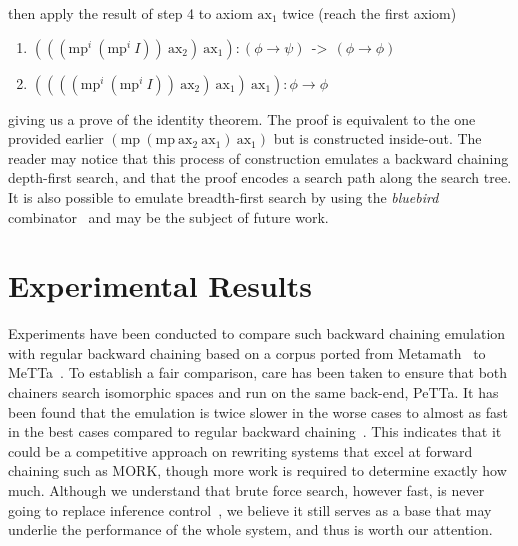 \documentclass{easychair}
\newcommand{\arrowtype}{\ \ \text{->}\ \ }
\newcommand{\axon}{\text{ax}_1}
\newcommand{\axtw}{\text{ax}_2}
\newcommand{\axmp}{\text{mp}}
\newcommand{\axmpi}{\text{mp}^i}
\newcommand{\idiot}{I}
\newcommand{\av}{\phi}
\newcommand{\bv}{\psi}
\begin{document}
then apply the result of step 4 to axiom $\axon$ twice (reach the first axiom)
\begin{enumerate}
\item[5.]
  $(((\axmpi\ (\axmpi\ \idiot))\ \axtw)\ \axon) : (\av \to \bv) \arrowtype (\av \to \av)$
\item[6.] $((((\axmpi\ (\axmpi\ \idiot))\ \axtw)\ \axon)\ \axon) : \av \to \av$
\end{enumerate}
giving us a prove of the identity theorem.  The proof is equivalent to
the one provided earlier $(\axmp\ (\axmp\ \axtw\ \axon)\ \axon)$ but
is constructed inside-out.  The reader may notice that this process of
construction emulates a backward chaining depth-first search, and that
the proof encodes a search path along the search tree.  It is also
possible to emulate breadth-first search by using the \emph{bluebird}
combinator~\cite{Smullyan1992ToMock} and may be the subject of future
work.

\section{Experimental Results}

Experiments have been conducted to compare such backward chaining
emulation with regular backward chaining based on a corpus ported from
Metamath~\cite{Metamath} to MeTTa~\cite{MeTTa,
  MeTTaSpecification2021}.  To establish a fair comparison, care has
been taken to ensure that both chainers search isomorphic spaces and
run on the same back-end, PeTTa.
It has been found that the emulation is twice slower in the worse
cases to almost as fast in the best cases compared to regular backward
chaining~\cite{Geisweiller2026BackwardViaForward}.  This indicates
that it could be a competitive approach on rewriting systems that
excel at forward chaining such as MORK, though more work is required
to determine exactly how much.  Although we understand that brute
force search, however fast, is never going to replace inference
control~\cite{Geisweiller2025AITP}, we believe it still serves as a
base that may underlie the performance of the whole system, and thus
is worth our attention.

\newpage



\label{sect:bib}
%
%
%


\newpage


\appendix

\end{document}
